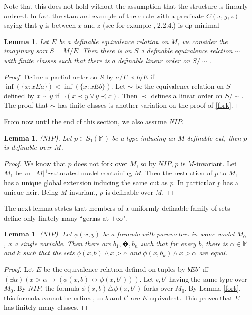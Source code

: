 \documentclass[english]{article}
\newtheorem{lemme}[thm]{Lemma}
\theoremstyle{definition}
\theoremstyle{mystyle}
\theoremstyle{remark}
\newcommand{\MM}{\mathbb M}
\begin{document}
Note that this does not hold without the assumption that the structure is linearly ordered. In fact the standard example of the circle with a predicate $C(x,y,z)$ saying that $y$ is between $x$ and $z$ (see for example \cite{Wag}, 2.2.4.) is dp-minimal.

\begin{lemme}
Let $E$ be a definable equivalence relation on $M$, we consider the imaginary sort $S=M/E$. Then there is on $S$ a definable equivalence relation $\sim$ with finite classes such that there is a definable linear order on $S/\sim$.
\end{lemme}
\begin{proof}
Define a partial order on $S$ by $a/E \prec b/E$ if  $\inf(\{x:xEa\}) < \inf(\{x:xEb\})$. Let $\sim$ be the equivalence relation on $S$ defined by $x \sim y$ if $\neg(x \prec y \vee y\prec x)$. Then $\prec$ defines a linear order on $S/\sim$. The proof that $\sim$ has finite classes is another variation on the proof of \ref{fork}.
\end{proof}

From now until the end of this section, we also assume $NIP$.

\begin{lemme}
($NIP$). Let $p \in S_1(\MM)$ be a type inducing an $M$-definable cut, then $p$ is definable over $M$.
\end{lemme}
\begin{proof}
We know that $p$ does not fork over $M$, so by $NIP$, $p$ is $M$-invariant. Let $M_1$ be an $|M|^+$-saturated model containing $M$. Then the restriction of $p$ to $M_1$ has a unique global extension inducing the same cut as $p$. In particular $p$ has a unique heir. Being $M$-invariant, $p$ is definable over $M$.
\end{proof}

The next lemma states that members of a uniformly definable family of sets define only finitely many ``germs at $+\infty$".
\begin{lemme}\label{germ1}
($NIP$). Let $\phi(x,y)$ be a formula with parameters in some model $M_0$, $x$ a single variable. Then there are $b_1,�,b_n$ such that for every $b$, there is $\alpha \in \MM$ and $k$ such that the sets $\phi(x,b) \wedge x>\alpha$ and $\phi(x,b_k) \wedge x>\alpha$ are equal.
\end{lemme}
\begin{proof}
Let $E$ be the equivalence relation defined on tuples by $b E b'$ iff $(\exists \alpha)(x>\alpha \rightarrow (\phi(x,b) \leftrightarrow \phi(x,b')))$. Let $b,b'$ having the same type over $M_0$. By $NIP$, the formula $\phi(x,b) \triangle \phi(x,b')$ forks over $M_0$. By Lemma \ref{fork}, this formula cannot be cofinal, so $b$ and $b'$ are $E$-equivalent. This proves that $E$ has finitely many classes.
\end{proof}
\end{document}
